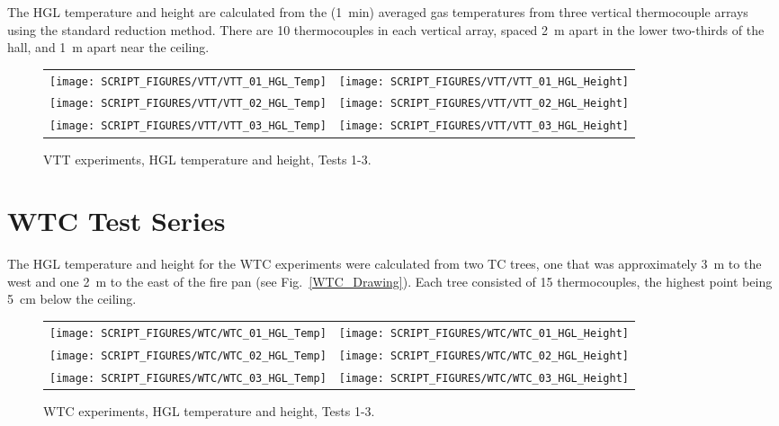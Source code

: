 The HGL temperature and height are calculated from the (1~min) averaged gas temperatures from three vertical thermocouple arrays using the standard reduction method. There are 10 thermocouples in each vertical array, spaced 2~m apart in the lower two-thirds of the hall, and 1~m apart near the ceiling.

\begin{figure}[h!]
\begin{tabular*}{\textwidth}{l@{\extracolsep{\fill}}r}
\texttt{[image: SCRIPT\_FIGURES/VTT/VTT\_01\_HGL\_Temp]} &
\texttt{[image: SCRIPT\_FIGURES/VTT/VTT\_01\_HGL\_Height]} \\
\texttt{[image: SCRIPT\_FIGURES/VTT/VTT\_02\_HGL\_Temp]} &
\texttt{[image: SCRIPT\_FIGURES/VTT/VTT\_02\_HGL\_Height]} \\
\texttt{[image: SCRIPT\_FIGURES/VTT/VTT\_03\_HGL\_Temp]} &
\texttt{[image: SCRIPT\_FIGURES/VTT/VTT\_03\_HGL\_Height]}
\end{tabular*}
\caption[VTT experiments, HGL temperature and height, Tests 1-3]
{VTT experiments, HGL temperature and height, Tests 1-3.}
\label{VTT_HGL}
\end{figure}



\clearpage

\section{WTC Test Series}

The HGL temperature and height for the WTC experiments were calculated from two TC trees, one that was approximately 3~m to the west and one
2~m to the east of the fire pan (see Fig.~\ref{WTC_Drawing}). Each tree consisted of 15 thermocouples, the highest point being 5~cm below the ceiling.

\begin{figure}[!h]
\begin{tabular*}{\textwidth}{l@{\extracolsep{\fill}}r}
\texttt{[image: SCRIPT\_FIGURES/WTC/WTC\_01\_HGL\_Temp]} &
\texttt{[image: SCRIPT\_FIGURES/WTC/WTC\_01\_HGL\_Height]} \\
\texttt{[image: SCRIPT\_FIGURES/WTC/WTC\_02\_HGL\_Temp]} &
\texttt{[image: SCRIPT\_FIGURES/WTC/WTC\_02\_HGL\_Height]} \\
\texttt{[image: SCRIPT\_FIGURES/WTC/WTC\_03\_HGL\_Temp]} &
\texttt{[image: SCRIPT\_FIGURES/WTC/WTC\_03\_HGL\_Height]}
\end{tabular*}
\caption[WTC experiments, HGL temperature and height, Tests 1-3]
{WTC experiments, HGL temperature and height, Tests 1-3.}
\label{WTC_HGL_1}
\end{figure}

